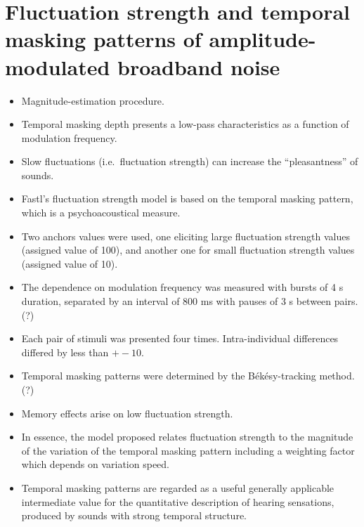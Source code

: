 \section{Fluctuation strength and temporal masking patterns of
amplitude-modulated broadband noise}

\begin{itemize}
    \item Magnitude-estimation procedure.
    \item Temporal masking depth presents a low-pass characteristics as a
        function of modulation frequency.
    \item Slow fluctuations (i.e.\ fluctuation strength) can increase the
        ``pleasantness'' of sounds.
    \item Fastl's fluctuation strength model is based on the temporal masking
        pattern, which is a psychoacoustical measure.
    \item  Two anchors values were used, one eliciting large fluctuation
        strength values (assigned value of 100), and another one for small
        fluctuation strength values (assigned value of 10).
    \item The dependence on modulation frequency was measured with bursts of 4 s
        duration, separated by an interval of 800 ms with pauses of 3 s between
        pairs. (?)
    \item Each pair of stimuli was presented four times. Intra-individual
        differences differed by less than $+-10$.
    \item Temporal masking patterns were determined by the Békésy-tracking
        method. (?)
    \item Memory effects arise on low fluctuation strength.
    \item In essence, the model proposed relates fluctuation strength to the
        magnitude of the variation of the temporal masking pattern including a
        weighting factor which depends on variation speed.
    \item Temporal masking patterns are regarded as a useful generally
        applicable intermediate value for the quantitative description of
        hearing sensations, produced by sounds with strong temporal structure.

\end{itemize}

